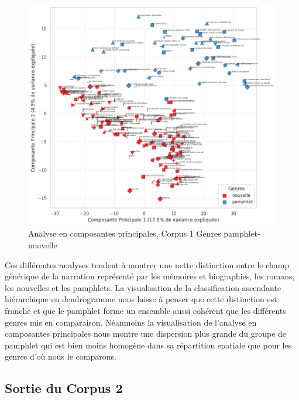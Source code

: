 \begin{figure}[H]
\centering %
\includegraphics[width=1\textwidth]{img/ACP-corpus-mix-PamNouvelle.png}
\caption{Analyse en composantes principales, Corpus 1 Genres pamphlet-nouvelle}
\label{'fig:ACP-corpus-mix-PamNouvelle'}
\end{figure}

Ces différentes analyses tendent à montrer une nette distinction entre le champ générique de la narration représenté par les mémoires et biographies, les romans, les nouvelles et les pamphlets.
La visualisation de la classification ascendante hiérarchique en dendrogramme nous laisse à penser que cette distinction est franche et que le pamphlet forme un ensemble aussi cohérent que les différents genres mis en comparaison. Néanmoins la visualisation de l'analyse en composantes principales nous montre une dispersion plus grande du groupe de pamphlet qui est bien moins homogène dans sa répartition spatiale que pour les genres d'où nous le comparons.

\subsection{Sortie du Corpus 2}

